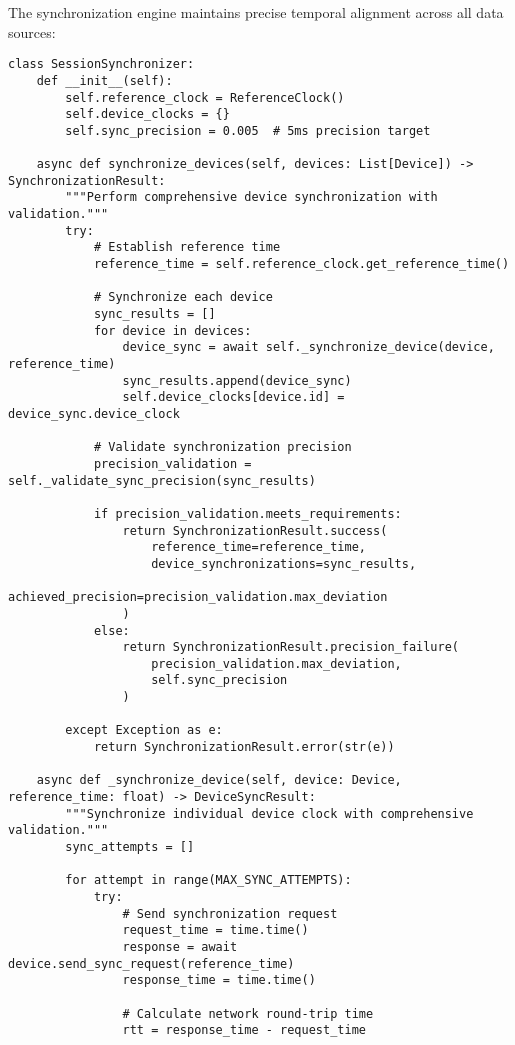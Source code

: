 \documentclass[12pt,a4paper]{article}
\begin{document}
The synchronization engine maintains precise temporal alignment across all data sources:

\begin{verbatim}
class SessionSynchronizer:
    def __init__(self):
        self.reference_clock = ReferenceClock()
        self.device_clocks = {}
        self.sync_precision = 0.005  # 5ms precision target

    async def synchronize_devices(self, devices: List[Device]) -> SynchronizationResult:
        """Perform comprehensive device synchronization with validation."""
        try:
            # Establish reference time
            reference_time = self.reference_clock.get_reference_time()

            # Synchronize each device
            sync_results = []
            for device in devices:
                device_sync = await self._synchronize_device(device, reference_time)
                sync_results.append(device_sync)
                self.device_clocks[device.id] = device_sync.device_clock

            # Validate synchronization precision
            precision_validation = self._validate_sync_precision(sync_results)

            if precision_validation.meets_requirements:
                return SynchronizationResult.success(
                    reference_time=reference_time,
                    device_synchronizations=sync_results,
                    achieved_precision=precision_validation.max_deviation
                )
            else:
                return SynchronizationResult.precision_failure(
                    precision_validation.max_deviation,
                    self.sync_precision
                )

        except Exception as e:
            return SynchronizationResult.error(str(e))

    async def _synchronize_device(self, device: Device, reference_time: float) -> DeviceSyncResult:
        """Synchronize individual device clock with comprehensive validation."""
        sync_attempts = []

        for attempt in range(MAX_SYNC_ATTEMPTS):
            try:
                # Send synchronization request
                request_time = time.time()
                response = await device.send_sync_request(reference_time)
                response_time = time.time()

                # Calculate network round-trip time
                rtt = response_time - request_time


\end{verbatim}
\end{document}
